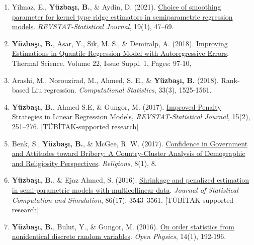 \documentclass[10pt,letterpaper]{article}
\newenvironment{etaremune}{\begin{enumerate}}{\end{enumerate}}
\newcommand{\JournalInfo}[2]{\hspace{0.3em}{\small\textsf{[#1; #2]}}}
\newcommand{\TubitakOutput}{{\small\textsf{[T\"{U}B\.{I}TAK-supported research]}}}
\begin{document}
\begin{etaremune}
\item
Yilmaz, E., {\bf Y\"{u}zba\c{s}{\i}, B.}, \& Aydin, D. (2021).
\href{https://www.ine.pt/revstat/pdf/REVSTAT-113-2017-R2.pdf}{ 
Choice of smoothing parameter for kernel type ridge estimators in semiparametric regression  models}. 
{\em REVSTAT-Statistical Journal}, 19(1), 47--69. \JournalInfo{SCIE}{Q2}


\item
{\bf Y\"{u}zba\c{s}{\i}, B.}, Asar, Y., Sik, M. S., \& Demiralp, A. (2018).  \href{http://thermalscience.vinca.rs/pdfs/papers-2018/TSCI170612275Y.pdf}{Improving Estimations in Quantile Regression Model with Autoregressive Errors}. Thermal Science. Volume 22, Issue Suppl. 1, Pages: 97-10, \JournalInfo{SCIE}{Q4}




\item 
Arashi, M., Norouzirad, M., Ahmed, S. E., \& {\bf Y\"{u}zba\c{s}{\i}, B.} (2018). Rank-based Liu regression. {\em Computational Statistics}, 33(3), 1525-1561. \JournalInfo{SCIE}{Q2}


\item {\bf Y\"{u}zba\c{s}{\i}, B.}, Ahmed S.E, \& Gungor, M. (2017). 
\href{https://www.ine.pt/revstat/pdf/rs170205.pdf}{Improved Penalty Strategies in Linear Regression Models}, 
\emph{REVSTAT-Statistical Journal}, 15(2), 251--276. \JournalInfo{SCIE}{Q2; WoS/JCR 2025} \TubitakOutput
\label{by2017a}

 \item Benk, S., {\bf Y\"{u}zba\c{s}{\i}, B.}, \& McGee, R. W. (2017). 
\href{http://www.mdpi.com/2077-1444/8/1/8}{Confidence in Government and Attitudes toward Bribery: A Country-Cluster Analysis of Demographic and Religiosity Perspectives}. 
\emph{Religions}, 8(1), 8. \JournalInfo{AHCI}{Q1}
\label{by2017b}


\item {\bf Y\"{u}zba\c{s}{\i}, B.}, \& Ejaz Ahmed, S. (2016). 
\href{http://www.tandfonline.com/doi/abs/10.1080/00949655.2016.1171868?journalCode=gscs20}
{Shrinkage and penalized estimation in semi-parametric models with multicollinear data}. 
\emph{Journal of Statistical Computation and Simulation}, 86(17), 3543--3561. \JournalInfo{SCIE}{Q2} \TubitakOutput
\label{by2016a}

\item {\bf Y\"{u}zba\c{s}{\i}, B.}, Bulut, Y., \& Gungor, M. (2016). 
\href{https://www.degruyter.com/view/j/phys.2016.14.issue-1/phys-2016-0022/phys-2016-0022.xml}
{On order statistics from nonidentical discrete random variables}. 
\emph{Open Physics}, 14(1), 192-196. \JournalInfo{SCIE}{Q2}


\end{etaremune}
\end{document}
